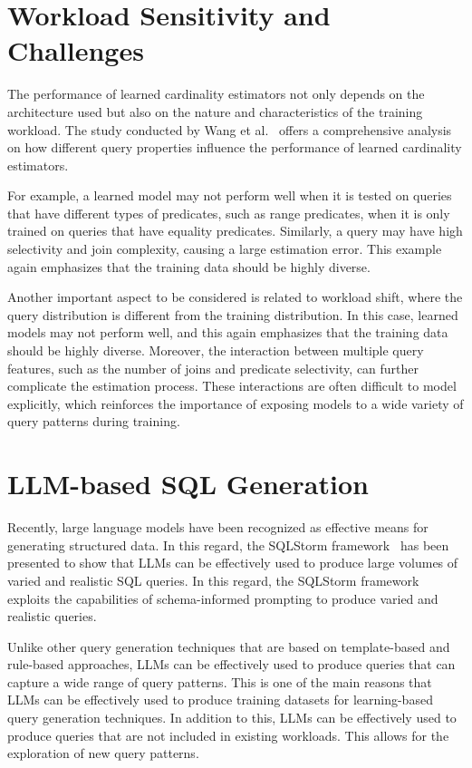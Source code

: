 \section{Workload Sensitivity and Challenges}

The performance of learned cardinality estimators not only depends on the architecture used but also on the nature and characteristics of the training workload. The study conducted by Wang et al.~\cite{DBLP:journals/pvldb/WangQWWZ21} offers a comprehensive analysis on how different query properties influence the performance of learned cardinality estimators.

For example, a learned model may not perform well when it is tested on queries that have different types of predicates, such as range predicates, when it is only trained on queries that have equality predicates. Similarly, a query may have high selectivity and join complexity, causing a large estimation error. This example again emphasizes that the training data should be highly diverse.

Another important aspect to be considered is related to workload shift, where the query distribution is different from the training distribution. In this case, learned models may not perform well, and this again emphasizes that the training data should be highly diverse. Moreover, the interaction between multiple query features, such as the number of joins and predicate selectivity, can further complicate the estimation process. These interactions are often difficult to model explicitly, which reinforces the importance of exposing models to a wide variety of query patterns during training.

\section{LLM-based SQL Generation}

Recently, large language models have been recognized as effective means for generating structured data. In this regard, the SQLStorm framework~\cite{DBLP:journals/pvldb/SchmidtLBN25} has been presented to show that LLMs can be effectively used to produce large volumes of varied and realistic SQL queries. In this regard, the SQLStorm framework exploits the capabilities of schema-informed prompting to produce varied and realistic queries.

Unlike other query generation techniques that are based on template-based and rule-based approaches, LLMs can be effectively used to produce queries that can capture a wide range of query patterns. This is one of the main reasons that LLMs can be effectively used to produce training datasets for learning-based query generation techniques. In addition to this, LLMs can be effectively used to produce queries that are not included in existing workloads. This allows for the exploration of new query patterns.

